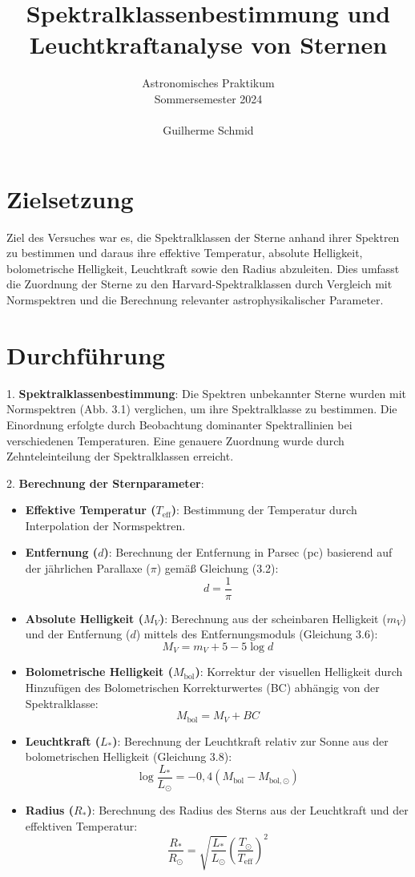 \documentclass[a4paper,12pt]{article}
\title{Spektralklassenbestimmung und Leuchtkraftanalyse von Sternen}
\author{Astronomisches Praktikum \\
Sommersemester 2024\\\\
Guilherme Schmid}
\date{}
\begin{document}
\maketitle

\section*{Zielsetzung}
Ziel des Versuches war es, die Spektralklassen der Sterne anhand ihrer Spektren zu bestimmen und daraus ihre effektive Temperatur, absolute Helligkeit, bolometrische Helligkeit, Leuchtkraft sowie den Radius abzuleiten. Dies umfasst die Zuordnung der Sterne zu den Harvard-Spektralklassen durch Vergleich mit Normspektren und die Berechnung relevanter astrophysikalischer Parameter.

\section*{Durchführung}
1. \textbf{Spektralklassenbestimmung}: 
   Die Spektren unbekannter Sterne wurden mit Normspektren (Abb. 3.1) verglichen, um ihre Spektralklasse zu bestimmen. Die Einordnung erfolgte durch Beobachtung dominanter Spektrallinien bei verschiedenen Temperaturen. Eine genauere Zuordnung wurde durch Zehnteleinteilung der Spektralklassen erreicht.

2. \textbf{Berechnung der Sternparameter}:
   \begin{itemize}
       \item \textbf{Effektive Temperatur (\( T_{\text{eff}} \))}: Bestimmung der Temperatur durch Interpolation der Normspektren.
       \item \textbf{Entfernung (\( d \))}: Berechnung der Entfernung in Parsec (pc) basierend auf der jährlichen Parallaxe (\( \pi \)) gemäß Gleichung (3.2):
       \[
       d = \frac{1}{\pi}
       \]
       \item \textbf{Absolute Helligkeit (\( M_V \))}: Berechnung aus der scheinbaren Helligkeit (\( m_V \)) und der Entfernung (\( d \)) mittels des Entfernungsmoduls (Gleichung 3.6):
       \[
       M_V = m_V + 5 - 5 \log d
       \]
       \item \textbf{Bolometrische Helligkeit (\( M_{\text{bol}} \))}: Korrektur der visuellen Helligkeit durch Hinzufügen des Bolometrischen Korrekturwertes (BC) abhängig von der Spektralklasse:
       \[
       M_{\text{bol}} = M_V + BC
       \]
       \item \textbf{Leuchtkraft (\( L_* \))}: Berechnung der Leuchtkraft relativ zur Sonne aus der bolometrischen Helligkeit (Gleichung 3.8):
       \[
       \log \frac{L_*}{L_\odot} = -0,4 (M_{\text{bol}} - M_{\text{bol},\odot})
       \]
       \item \textbf{Radius (\( R_* \))}: Berechnung des Radius des Sterns aus der Leuchtkraft und der effektiven Temperatur:
       \[
       \frac{R_*}{R_\odot} = \sqrt{\frac{L_*}{L_\odot}} \left(\frac{T_\odot}{T_{\text{eff}}}\right)^2
       \]
   \end{itemize}
\end{document}
